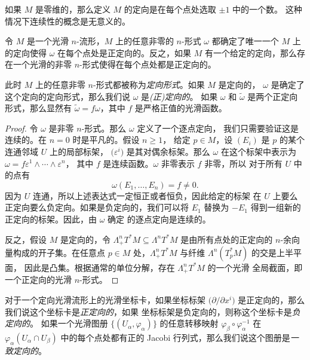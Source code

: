 如果 $M$ 是零维的，那么定义 $M$ 的定向是在每个点处选取 $\pm 1$ 中的一个数。
这种情况下连续性的概念是无意义的。

\begin{proposition}[由 $n$-形式确定的定向]
  令 $M$ 是一个光滑 $n$-流形，$M$ 上的任意非零的 $n$-形式 $\omega$ 都确定了唯一一个
  $M$ 上的定向使得 $\omega$ 在每个点处是正定向的。反之，如果 $M$
  有一个给定的定向，那么存在一个光滑的非零 $n$-形式使得在每个点处都是正定向的。
\end{proposition}
\begin{remark}
  此时 $M$ 上的任意非零 $n$-形式都被称为\emph{定向形式}。如果 $M$ 是定向的，
  $\omega$ 是确定了这个定向的定向形式，那么我们说 $\omega$ 是\emph{(正)定向的}。
  如果 $\omega$ 和 $\tilde\omega$ 是两个正定向形式，那么显然有 
  $\tilde\omega=f\omega$，其中 $f$ 是严格正值的光滑函数。
\end{remark}
\begin{proof}
  令 $\omega$ 是非零 $n$-形式。那么 $\omega$ 定义了一个逐点定向，
  我们只需要验证这是连续的。在 $n=0$ 时是平凡的。假设 $n\ge 1$，
  给定 $p\in M$，设 $(E_i)$ 是 $p$ 的某个连通邻域 $U$ 上的局部标架，
  $\bigl(\varepsilon^i\bigr)$ 是其对偶余标架。那么 $\omega$
  在这个标架中表示为 $\omega=f\varepsilon^1\wedge\cdots\wedge\varepsilon^n$，
  其中 $f$ 是连续函数。$\omega$ 非零表示 $f$ 非零，所以
  对于所有 $U$ 中的点有
  \[
    \omega(E_1,\dots,E_n)=f\neq 0.
  \]
  因为 $U$ 连通，所以上述表达式一定恒正或者恒负，因此给定的标架
  在 $U$ 上要么正定向要么负定向。如果是负定向的，我们可以将 $E_1$
  替换为 $-E_1$ 得到一组新的正定向的标架。因此，由 $\omega$ 确定
  的逐点定向是连续的。

  反之，假设 $M$ 是定向的，令 $\Lambda_+^nT^*M\subseteq \Lambda^nT^*M$
  是由所有点处的正定向的 $n$-余向量构成的开子集。在任意点 $p\in M$
  处，$\Lambda_+^nT^*M$ 与纤维 $\Lambda^n(T_p^*M)$ 的交是上半平面，
  因此是凸集。根据通常的单位分解，存在 $\Lambda_+^nT^*M$ 的一个光滑
  全局截面，即一个正定向的光滑 $n$-形式。
\end{proof}

对于一个定向光滑流形上的光滑坐标卡，如果坐标标架 $\bigl(\partial/\partial x^i\bigr)$
是正定向的，那么我们说这个坐标卡是\emph{正定向的}，如果
坐标标架是负定向的，则称这个坐标卡是\emph{负定向的}。
如果一个光滑图册 $\{(U_\alpha,\varphi_\alpha)\}$ 的任意转移映射
$\varphi_\beta\circ\varphi_\alpha^{-1}$ 在 $\varphi_\alpha(U_\alpha\cap U_\beta)$
中的每个点处都有正的 Jacobi 行列式，那么我们说这个图册是\emph{一致定向的}。







